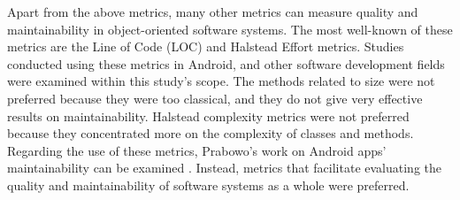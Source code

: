 Apart from the above metrics, many other metrics can measure quality and maintainability in object-oriented software systems. The most well-known of these metrics are the Line of Code (LOC) and Halstead Effort metrics. Studies conducted using these metrics in Android, and other software development fields were examined within this study's scope. The methods related to size were not preferred because they were too classical, and they do not give very effective results on maintainability. Halstead complexity metrics were not preferred because they concentrated more on the complexity of classes and methods. Regarding the use of these metrics, Prabowo's work on Android apps' maintainability can be examined \cite{19}. Instead, metrics that facilitate evaluating the quality and maintainability of software systems as a whole were preferred.

